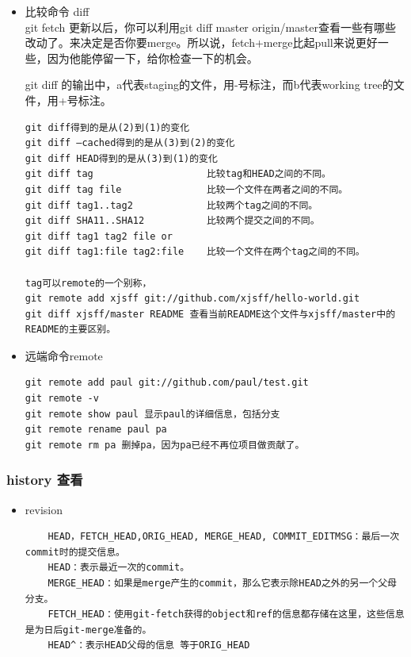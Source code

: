 \documentclass[a4paper,12pt,twoside]{book}
\begin{document}
\begin{CJK*}{UTF8}{song}
\begin{itemize}
\begin{verbatim}
\end{verbatim}

\item 比较命令 diff \\
 git fetch 更新以后，你可以利用git diff master origin/master查看一些有哪些改动了。来决定是否你要merge。所以说，fetch+merge比起pull来说更好一些，因为他能停留一下，给你检查一下的机会。 \par
 git diff 的输出中，a代表staging的文件，用-号标注，而b代表working tree的文件，用+号标注。
 \par
    \begin{verbatim}
git diff得到的是从(2)到(1)的变化
git diff –cached得到的是从(3)到(2)的变化
git diff HEAD得到的是从(3)到(1)的变化
git diff tag                    比较tag和HEAD之间的不同。
git diff tag file               比较一个文件在两者之间的不同。
git diff tag1..tag2             比较两个tag之间的不同。
git diff SHA11..SHA12           比较两个提交之间的不同。
git diff tag1 tag2 file or
git diff tag1:file tag2:file    比较一个文件在两个tag之间的不同。

tag可以remote的一个别称，
git remote add xjsff git://github.com/xjsff/hello-world.git
git diff xjsff/master README 查看当前README这个文件与xjsff/master中的README的主要区别。
    \end{verbatim}

\item 远端命令remote \\
\begin{verbatim}
git remote add paul git://github.com/paul/test.git
git remote -v
git remote show paul 显示paul的详细信息，包括分支
git remote rename paul pa
git remote rm pa 删掉pa，因为pa已经不再位项目做贡献了。
\end{verbatim}

\end{itemize}

\subsubsection{history 查看}
\begin{itemize}
\item revision \\
    \begin{verbatim}
    HEAD，FETCH_HEAD,ORIG_HEAD, MERGE_HEAD, COMMIT_EDITMSG：最后一次commit时的提交信息。
    HEAD：表示最近一次的commit。
    MERGE_HEAD：如果是merge产生的commit，那么它表示除HEAD之外的另一个父母分支。
    FETCH_HEAD：使用git-fetch获得的object和ref的信息都存储在这里，这些信息是为日后git-merge准备的。
    HEAD^：表示HEAD父母的信息 等于ORIG_HEAD


\end{verbatim}
\end{itemize}
\end{CJK*}
\end{document}
